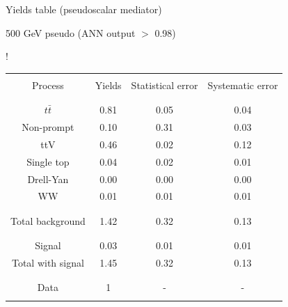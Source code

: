 \documentclass[handout,8 pt]{beamer}
\begin{document}
\begin{frame}{Yields table (pseudoscalar mediator)}
\begin{minipage}[c]{.48\linewidth}
\begin{center}
	\end{center}

	\end{minipage} \hfill
	\begin{minipage}[c]{.48\linewidth}
	
	\begin{exampleblock}{}{ \begin{center} 500 GeV pseudo (ANN output $>$ 0.98) \end{center}} \end{exampleblock} \vspace{8pt}
	
	\resizebox{170pt} {!}{
	\begin{tabular}{c|c|c|c}
	 	& & & \\
		Process & Yields & Statistical error & Systematic error \\
		& & & \\
		\hline \hline
		& & & \\
		$t \bar t$ & 0.81 & 0.05 & 0.04 \\
		Non-prompt & 0.10 & 0.31 & 0.03 \\
		ttV & 0.46 & 0.02 & 0.12 \\
		Single top & 0.04 & 0.02 & 0.01 \\
		Drell-Yan & 0.00 & 0.00 & 0.00 \\
		WW & 0.01 & 0.01 & 0.01 \\
		& & & \\
		\hline
		& & & \\
		Total background & 1.42 & 0.32  & 0.13 \\
		& & & \\
		\hline
		& & & \\
		Signal & 0.03 & 0.01 & 0.01 \\
		Total with signal & 1.45 & 0.32 & 0.13 \\
		& & & \\
		\hline
		& & & \\
		Data & 1 & - & - \\
		& & & \\
	\end{tabular}
	} 
	
	\end{minipage} \hfill \vfill

\end{frame}
\end{document}

